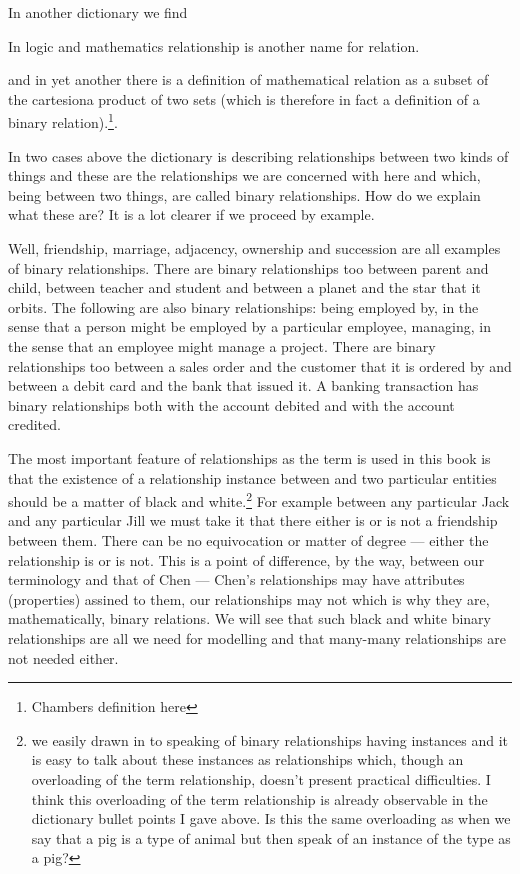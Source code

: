 \mynote
In another dictionary we find 
\begin{erquote}
In logic and mathematics relationship is another name for relation.
\end{erquote}
and in yet another there is a definition of mathematical relation as a subset of the cartesiona product of two sets (which is therefore in fact a definition of a binary relation).\footnote{Chambers definition here}.
 

\mynote In two cases above the dictionary is describing relationships between two kinds of things and these are the relationships we are concerned with here and which, being between two things, are called binary relationships. How do we explain what these are? It is a lot clearer if we proceed by example.

\mynote
Well, friendship,  marriage, adjacency, ownership and succession are all examples of binary relationships. There are binary relationships too  between parent and child, between teacher and student and between a planet and the star that it orbits.   
The following are also binary relationships:
being employed by, in the sense that a person might be employed by a particular employee,
managing, in the sense that an employee might manage a project. There are binary relationships too between a sales order and the customer that it is ordered by and between a debit card and  the bank that issued it. A banking transaction has binary relationships both with the account debited and with the account credited. 

\mynote The most important feature of relationships as the term is used  in this book is that the existence of a relationship instance between and two particular entities should be a matter of black and white.\footnote{we easily drawn in to speaking of binary relationships having instances and it is easy to talk about these instances as relationships which, though an overloading of the term relationship, doesn't present practical difficulties.
I think this overloading of the term relationship is already observable in the dictionary bullet points I gave above. Is this the same overloading as when we say that a pig is a type of animal but then speak of an instance of the type as a pig?} For example between any particular Jack and any particular Jill we must take it that there either is or is not a friendship between them. There can be no equivocation or matter of degree --- either the relationship is or is not. This is a point of difference, by the way, between our terminology and that of Chen --- Chen's relationships may have attributes (properties) assined to them, our relationships may not which is why they are, mathematically, binary relations. We will see that such black and white binary relationships are all we need for modelling and that many-many relationships are not needed either. 

